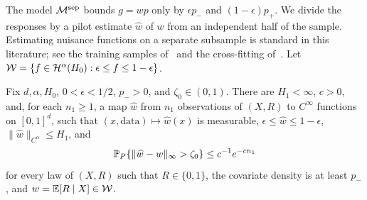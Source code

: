 The model $\mathcal M^{\rm sep}$ bounds $g=wp$ only by $\epsilon p_-$
and $(1-\epsilon)p_+$. We divide the responses by a pilot estimate
$\widehat w$ of $w$ from an independent half of the sample. Estimating
nuisance functions on a separate subsample is standard in this
literature; see the training samples of~\cite{hoif2008} and the
cross-fitting of~\cite{neweyrobins}. Let
$\mathcal W=\{f\in\mathcal H^\alpha(H_0):\epsilon\le f\le1-\epsilon\}$.

\begin{lemma}\label{lem:smooth-propensity-pilot}
Fix $d,\alpha,H_0$, $0<\epsilon<1/2$, $p_->0$, and $\zeta_0\in(0,1)$.
There are $H_1<\infty$, $c>0$, and, for each $n_1\ge1$, a map
$\widehat w$ from $n_1$ observations of $(X,R)$ to $C^\infty$ functions
on $[0,1]^d$, such that $(x,\text{data})\mapsto\widehat w(x)$ is
measurable, $\epsilon\le\widehat w\le1-\epsilon$,
$\|\widehat w\|_{C^\alpha}\le H_1$, and
\[
 \mathbb P_P\{\|\widehat w-w\|_\infty>\zeta_0\}\le c^{-1}e^{-cn_1}
\]
for every law of $(X,R)$ such that $R\in\{0,1\}$, the covariate density
is at least $p_-$, and $w=\mathbb E[R\mid X]\in\mathcal W$.
\end{lemma}

